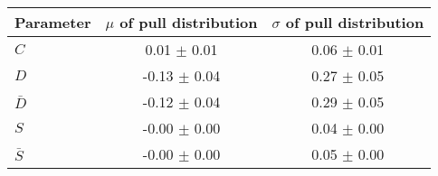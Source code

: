 \begin{tabular}{l  c  c}
\hline
Parameter & $\mu$ of pull distribution & $\sigma$ of pull distribution \\
\hline
\hline
$C$ & 0.01 $\pm$ 0.01 & 0.06 $\pm$ 0.01 \\
$D$ & -0.13 $\pm$ 0.04 & 0.27 $\pm$ 0.05 \\
$\bar{D}$ & -0.12 $\pm$ 0.04 & 0.29 $\pm$ 0.05 \\
$S$ & -0.00 $\pm$ 0.00 & 0.04 $\pm$ 0.00 \\
$\bar{S}$ & -0.00 $\pm$ 0.00 & 0.05 $\pm$ 0.00 \\
\hline
\end{tabular}
